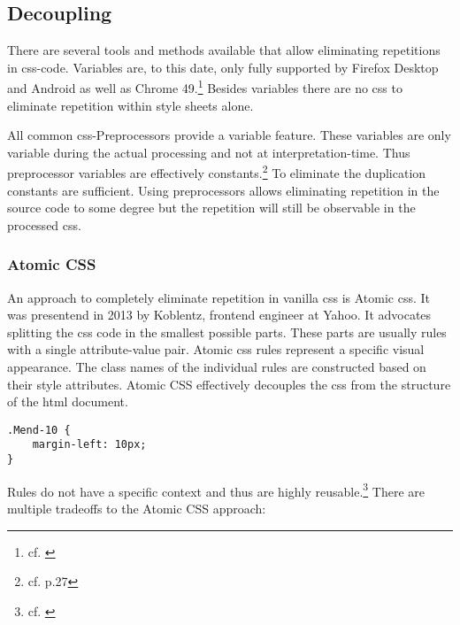 \subsection{Decoupling}
There are several tools and methods available that allow eliminating repetitions in \gls{css}-code.
Variables are, to this date, only fully supported by Firefox Desktop and Android as well as Chrome 49.\footnote{cf. \cite{cssvariables}}
Besides variables there are no \gls{css} to eliminate repetition within style sheets alone.

All common \gls{css}-Preprocessors provide a variable feature.
These variables are only variable during the actual processing and not at interpretation-time.
Thus preprocessor variables are effectively constants.\footnote{cf. \cite{wirthpreprocessors} p.27}
To eliminate the duplication constants are sufficient.
Using preprocessors allows eliminating repetition in the source code to some degree
but the repetition will still be observable in the processed \gls{css}.

\subsubsection*{Atomic CSS}
An approach to completely eliminate repetition in vanilla \gls{css} is Atomic \gls{css}.
It was presentend in 2013 by Koblentz, frontend engineer at Yahoo.
It advocates splitting the \gls{css} code in the smallest possible parts.
These parts are usually rules with a single attribute-value pair.
Atomic \gls{css} rules represent a specific visual appearance.
The class names of the individual rules are constructed based on their style attributes.
Atomic CSS effectively decouples the \gls{css} from the structure of the \gls{html} document.

\begin{lstlisting}
.Mend-10 {
    margin-left: 10px;
}
\end{lstlisting}

Rules do not have a specific context and thus are highly reusable.\footnote{cf. \cite{atomiccssarticle}}
There are multiple tradeoffs to the Atomic CSS approach:


